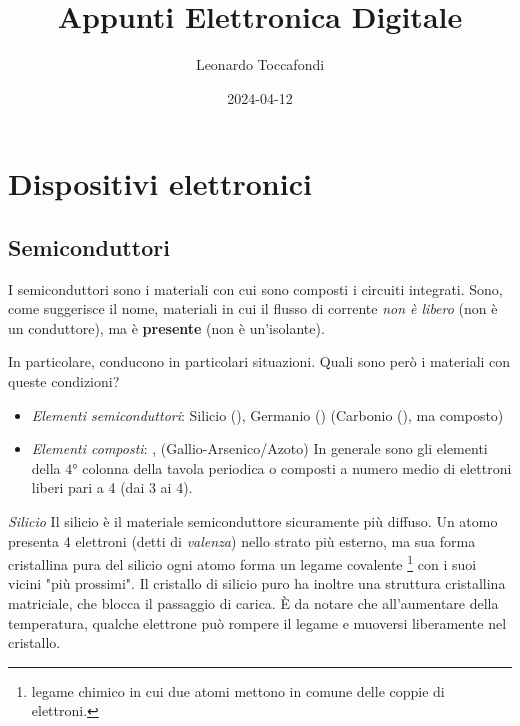 \documentclass[
]{book}
\title{Appunti Elettronica Digitale}
\author{Leonardo Toccafondi}
\date{2024-04-12}
\providecommand{\tightlist}{%
  \setlength{\itemsep}{0pt}\setlength{\parskip}{0pt}}
\begin{document}
\frontmatter
\maketitle

{
\setcounter{tocdepth}{2}
\tableofcontents
}
\mainmatter
\chapter{Dispositivi elettronici}\label{dispositivi-elettronici}

\section{Semiconduttori}\label{semiconduttori}

I semiconduttori sono i materiali con cui sono composti i circuiti
integrati. Sono, come suggerisce il nome, materiali in cui il flusso di
corrente \emph{non è libero} (non è un conduttore), ma è
\textbf{presente} (non è un'isolante).

In particolare, conducono in particolari situazioni. Quali sono però i
materiali con queste condizioni?

\begin{itemize}
\tightlist
\item
  \emph{Elementi semiconduttori}: Silicio (), Germanio ()
  (Carbonio (), ma composto)
\item
  \emph{Elementi composti}: ,  (Gallio-Arsenico/Azoto)
  In generale sono gli elementi della \(4°\) colonna della tavola
  periodica o composti a numero medio di elettroni liberi pari a 4 (dai
  3 ai 4).
\end{itemize}

\begin{mybox}{\emph{Silicio}}
Il silicio è il materiale semiconduttore sicuramente più diffuso. \newline
Un atomo presenta 4 elettroni (detti di \emph{valenza}) nello strato più esterno,
ma sua forma cristallina pura del silicio ogni atomo forma un legame covalente
\footnote{legame chimico in cui due atomi mettono in comune delle coppie di elettroni.}
con i suoi vicini "più prossimi".
Il cristallo di silicio puro ha inoltre una struttura cristallina matriciale,
che blocca il passaggio di carica. \newline
È da notare che all'aumentare della temperatura, qualche elettrone può rompere il legame
e muoversi liberamente nel cristallo.
\end{mybox}
\end{document}
